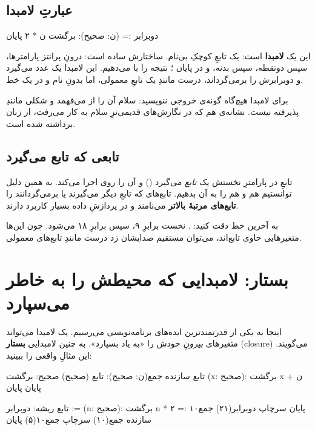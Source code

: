 \subsection{عبارتِ لامبدا}

\begin{salamfa}
دوبرابر := (ن: صحیح): برگشت ن * ۲ پایان
\end{salamfa}

این یک \textbf{لامبدا} است: یک تابعِ کوچکِ بی‌نام. ساختارش ساده است: درونِ
پرانتز پارامترها، سپس دونقطه، سپس بدنه، و در پایان ؛ نتیجه را با
 می‌دهیم. این لامبدا یک عدد می‌گیرد و دوبرابرش را برمی‌گرداند،
درست مانندِ یک تابعِ معمولی، اما بدونِ نام و در یک خط.

برای لامبدا هیچ‌گاه گونه‌ی خروجی ننویسید: سلام آن را از  می‌فهمد و
شکلی مانندِ  پذیرفته نیست. نشانه‌ی \code{=>} هم که
در نگارش‌های قدیمی‌ترِ سلام به کار می‌رفت، از زبان برداشته شده است.

\subsection{تابعی که تابع می‌گیرد}

تابعِ  در پارامترِ نخستش یک \emph{تابع} می‌گیرد () و آن را
روی  اجرا می‌کند. به همین دلیل توانستیم هم  و هم
 را به آن بدهیم. تابع‌های که تابعِ دیگر می‌گیرند یا برمی‌گردانند را
\textbf{تابع‌های مرتبهٔ بالاتر} می‌نامند و در پردازشِ داده بسیار کاربرد دارند.

\begin{note}
به آخرین خط دقت کنید: . نخست  برابرِ ۹، سپس
 برابرِ ۱۸ می‌شود. چون این‌ها متغیرهایی حاوی تابع‌اند، می‌توان
مستقیم صدایشان زد درست مانندِ تابع‌های معمولی.
\end{note}

\section{بستار: لامبدایی که محیطش را به خاطر می‌سپارد}

اینجا به یکی از قدرتمندترین ایده‌های برنامه‌نویسی می‌رسیم. یک لامبدا می‌تواند
متغیرهای \emph{بیرونِ} خودش را «به یاد بسپارد». به چنین لامبدایی \textbf{بستار}
(closure) می‌گویند. این مثالِ واقعی را ببینید:

\begin{salamfa}
تابع سازنده جمع(ن: صحیح): تابع (صحیح) صحیح:
    برگشت (x: صحیح): برگشت x + ن پایان
پایان

تابع ریشه:
    دوبرابر := (n: صحیح): برگشت n * ۲ پایان
    سرچاپ دوبرابر(۲۱)
    جمع۱۰ := سازنده جمع(۱۰)
    سرچاپ جمع۱۰(۵)
پایان
\end{salamfa}


